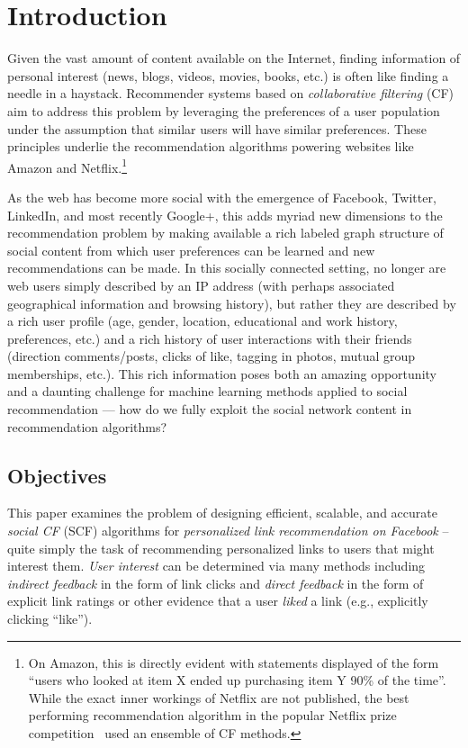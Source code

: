 
\chapter{Introduction}
\label{cha:intro}

Given the vast amount of content available on the Internet, finding
information of personal interest (news, blogs, videos, movies, books,
etc.) is often like finding a needle in a haystack.  Recommender
systems based on \emph{collaborative filtering} (CF) aim to address
this problem by leveraging the preferences of a user
population under the assumption that similar users
will have similar preferences.  These principles underlie the
recommendation algorithms powering websites like Amazon and
Netflix.\footnote{On Amazon, this is directly evident with statements
displayed of the form ``users who looked at item X ended up purchasing
item Y 90\% of the time''.  While the exact inner workings of Netflix
are not published, the best performing recommendation algorithm in
the popular Netflix prize competition~\cite{netflix} 
used an ensemble of CF methods.}

As the web has become more social with the emergence of Facebook,
Twitter, LinkedIn, and most recently Google+, this adds myriad new
dimensions to the recommendation problem by making available a rich
labeled graph structure of social content from which user preferences
can be learned and new recommendations can be made.  In this socially
connected setting, no longer are web users simply described by an IP
address (with perhaps associated geographical information and browsing
history), but rather they are described by a rich user profile (age,
gender, location, educational and work history, preferences, etc.)
and a rich history of user interactions with their friends (direction
comments/posts, clicks of like, tagging in photos, mutual group
memberships, etc.).  This rich information poses both an amazing
opportunity and a daunting challenge for machine learning methods
applied to social recommendation --- how do we fully exploit the social
network content in recommendation algorithms?

\section{Objectives}

This paper examines the problem of designing efficient, scalable, and
accurate \emph{social CF} (SCF) algorithms for \emph{personalized link
recommendation on Facebook} -- quite simply the task of recommending
personalized links to users that might interest them.  \emph{User
interest} can be determined via many methods including \emph{indirect
feedback} in the form of link clicks and \emph{direct feedback} in the form of
explicit link ratings or other evidence that a user \emph{liked}
a link (e.g., explicitly clicking ``like'').

